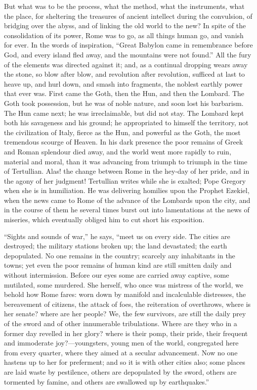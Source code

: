 But what was to be the process, what the method, what the
instruments, what the place, for sheltering the treasures of ancient
intellect during the convulsion, of bridging over the abyss, and of
linking the old world to the new? In spite of the consolidation of its
power, Rome was to go, as all things human go, and vanish for ever. In the words of inspiration, ``Great Babylon came in
remembrance before God, and every island fled away, and the mountains
were not found.'' All the fury of the elements was directed
against it; and, as a continual dropping wears away the stone, so blow
after blow, and revolution after revolution, sufficed at last to heave
up, and hurl down, and smash into fragments, the noblest earthly power
that ever was. First came the Goth, then the Hun, and then the
Lombard. The Goth took possession, but he was of noble nature, and
soon lost his barbarism. The Hun came next; he was irreclaimable, but
did not stay. The Lombard kept both his savageness and his ground; he
appropriated to himself the territory, not the civilization of Italy,
fierce as the Hun, and powerful as the Goth, the most tremendous
scourge of Heaven. In his dark presence the poor remains of Greek and
Roman splendour died away, and the world went more rapidly to ruin,
material and moral, than it was advancing from triumph to triumph in
the time of Tertullian. Alas! the change between Rome in the hey-day
of her pride, and in the agony of her judgment! Tertullian writes
while she is exalted; Pope Gregory when she is in humiliation. He was
delivering homilies upon the Prophet Ezekiel, when the news came to
Rome of the advance of the Lombards upon the city, and in the course
of them he several times burst out into lamentations at the news of
miseries, which eventually obliged him to cut short his exposition.

``Sights and sounds of war,'' he says, ``meet us on
every side. The cities are destroyed; the military stations broken up;
the land devastated; the earth depopulated. No one remains in the
country; scarcely any inhabitants in the towns; yet even the poor
remains of human kind are still smitten daily and without
intermission. Before our eyes some are carried away captive,
some mutilated, some murdered. She herself, who once was mistress of
the world, we behold how Rome fares: worn down by manifold and
incalculable distresses, the bereavement of citizens, the attack of
foes, the reiteration of overthrows, where is her senate? where are
her people? We, the few survivors, are still the daily prey of the
sword and of other innumerable tribulations. Where are they who in a
former day revelled in her glory? where is their pomp, their pride,
their frequent and immoderate joy?—youngsters, young men of the
world, congregated here from every quarter, where they aimed at a
secular advancement. Now no one hastens up to her for preferment; and
so it is with other cities also; some places are laid waste by
pestilence, others are depopulated by the sword, others are tormented
by famine, and others are swallowed up by earthquakes.''

